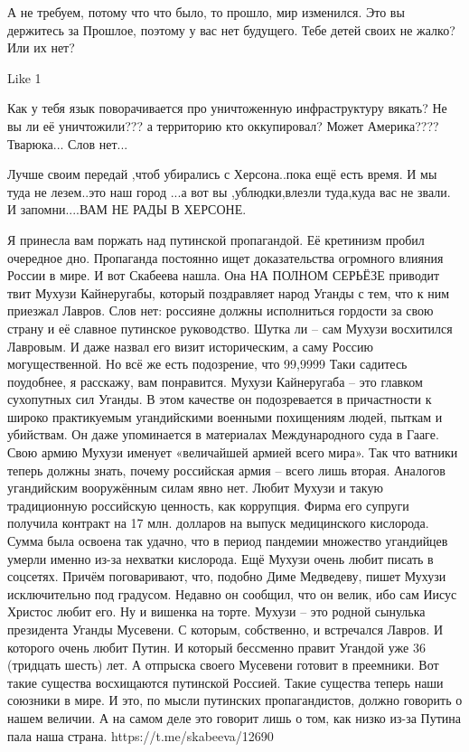{А не требуем, потому что что было, то прошло, мир изменился. Это вы держитесь
за Прошлое, поэтому у вас нет будущего. Тебе детей своих не жалко? Или их нет?

    Like 1


Как у тебя язык поворачивается про уничтоженную инфраструктуру вякать? Не вы ли
её уничтожили??? а территорию кто оккупировал? Может Америка????Тварюка... Слов
нет...


Лучше своим передай ,чтоб убирались с Херсона..пока ещё есть время. И мы туда
не лезем..это наш город ...а вот вы ,ублюдки,влезли туда,куда вас не звали. И
запомни....ВАМ НЕ РАДЫ В ХЕРСОНЕ.

Я принесла вам поржать над путинской пропагандой.
Её кретинизм пробил очередное дно.
Пропаганда постоянно ищет доказательства огромного влияния России в мире.
И вот Скабеева нашла.
Она НА ПОЛНОМ СЕРЬЁЗЕ приводит твит Мухузи Кайнеругабы, который поздравляет народ Уганды с тем, что к ним приезжал Лавров.
Слов нет: россияне должны исполниться гордости за свою страну и её славное путинское руководство.
Шутка ли – сам Мухузи восхитился Лавровым.
И даже назвал его визит историческим, а саму Россию могущественной.
Но всё же есть подозрение, что 99,9999%
Таки садитесь поудобнее, я расскажу, вам понравится.
Мухузи Кайнеругаба – это главком сухопутных сил Уганды.
В этом качестве он подозревается в причастности к широко практикуемым угандийскими военными похищениям людей, пыткам и убийствам.
Он даже упоминается в материалах Международного суда в Гааге.
Свою армию Мухузи именует «величайшей армией всего мира».
Так что ватники теперь должны знать, почему российская армия – всего лишь вторая.
Аналогов угандийским вооружённым силам явно нет.
Любит Мухузи и такую традиционную российскую ценность, как коррупция.
Фирма его супруги получила контракт на 17 млн. долларов на выпуск медицинского кислорода.
Сумма была освоена так удачно, что в период пандемии множество угандийцев умерли именно из-за нехватки кислорода.
Ещё Мухузи очень любит писать в соцсетях.
Причём поговаривают, что, подобно Диме Медведеву, пишет Мухузи исключительно под градусом.
Недавно он сообщил, что он велик, ибо сам Иисус Христос любит его.
Ну и вишенка на торте.
Мухузи – это родной сынулька президента Уганды Мусевени.
С которым, собственно, и встречался Лавров.
И которого очень любит Путин.
И который бессменно правит Угандой уже 36 (тридцать шесть) лет.
А отпрыска своего Мусевени готовит в преемники.
Вот такие существа восхищаются путинской Россией.
Такие существа теперь наши союзники в мире.
И это, по мысли путинских пропагандистов, должно говорить о нашем величии.
А на самом деле это говорит лишь о том, как низко из-за Путина пала наша страна.
https://t.me/skabeeva/12690

}
